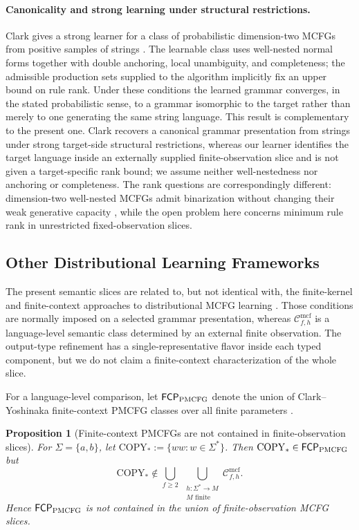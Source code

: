 \documentclass[11pt,a4paper]{article}
\numberwithin{equation}{section}
\theoremstyle{plain}
\newtheorem{proposition}[theorem]{Proposition}
\theoremstyle{definition}
\theoremstyle{remark}
\newcommand{\Cmcf}[2]{\mathcal{C}^{\mathrm{mcf}}_{#1,#2}}
\begin{document}
\paragraph{Canonicality and strong learning under structural restrictions.}
Clark gives a strong learner for a class of probabilistic dimension-two MCFGs
from positive samples of strings \cite{Clark2021Strong}.  The learnable class
uses well-nested normal forms together with double anchoring, local
unambiguity, and completeness; the admissible production sets supplied to the
algorithm implicitly fix an upper bound on rule rank.  Under these conditions
the learned grammar converges, in the stated probabilistic sense, to a grammar
isomorphic to the target rather than merely to one generating the same string
language.  This result is complementary to the present one.  Clark recovers a
canonical grammar presentation from strings under strong target-side
structural restrictions, whereas our learner identifies the target language
inside an externally supplied finite-observation slice and is not given a
target-specific rank bound; we assume neither well-nestedness nor anchoring or
completeness.  The rank questions are correspondingly different: dimension-two
well-nested MCFGs admit binarization without changing their weak generative
capacity \cite{Clark2021Strong}, while the open problem here concerns minimum
rule rank in unrestricted fixed-observation slices.


\subsection{Other Distributional Learning Frameworks}

The present semantic slices are related to, but not identical with, the
finite-kernel and finite-context approaches to distributional MCFG learning
\cite{Yoshinaka2010,ClarkYoshinaka2014,ClarkYoshinaka2016,KanazawaYoshinaka2017}.
Those conditions are normally imposed on a selected grammar presentation,
whereas $\Cmcf{f}{h}$ is a language-level semantic class determined by an
external finite observation.  The output-type refinement has a
single-representative flavor inside each typed component, but we do not claim a
finite-context characterization of the whole slice.

For a language-level comparison, let $\mathsf{FCP}_{\rm PMCFG}$ denote the
union of Clark--Yoshinaka finite-context PMCFG classes over all finite
parameters \cite{ClarkYoshinaka2012PMCFG,ClarkYoshinaka2014}.

\begin{proposition}[Finite-context PMCFGs are not contained in finite-observation slices]
\label{prop:fcp-not-contained-observation}
For $\Sigma=\{a,b\}$, let $\mathrm{COPY}_*:=\{ww:w\in\Sigma^*\}$.  Then
$\mathrm{COPY}_*\in\mathsf{FCP}_{\rm PMCFG}$ but
\[
 \mathrm{COPY}_*\notin
 \bigcup_{f\ge2}\ \bigcup_{\substack{h:\Sigma^*\to M\\ M\text{ finite}}}
 \Cmcf{f}{h}.
\]
Hence $\mathsf{FCP}_{\rm PMCFG}$ is not contained in the union of finite-observation
MCFG slices.
\end{proposition}
\end{document}
